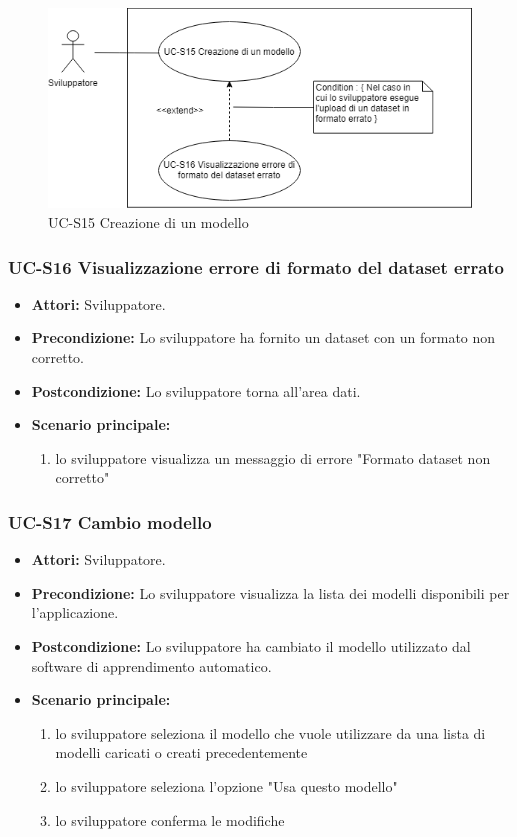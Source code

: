 		\begin{figure}[h]
			\centering
			\includegraphics[scale=0.7]{images/UC-S15.png}
				\caption{UC-S15 Creazione di un modello}
		\end{figure}	
	
	\subsubsection{UC-S16 Visualizzazione errore di formato del dataset errato}	
	\begin{itemize}					
			\item \textbf{Attori:} Sviluppatore.
			\item \textbf{Precondizione:} Lo sviluppatore ha fornito un dataset con un formato non corretto.
			\item \textbf{Postcondizione:} Lo sviluppatore torna all'area dati.
			\item \textbf{Scenario principale:}
				\begin{enumerate}
					\item lo sviluppatore visualizza un messaggio di errore "Formato dataset non corretto"
				\end{enumerate}	
		\end{itemize}		
	
	\subsubsection{UC-S17 Cambio modello}
	\begin{itemize}					
			\item \textbf{Attori:} Sviluppatore.
			\item \textbf{Precondizione:} Lo sviluppatore visualizza la lista dei modelli disponibili per l'applicazione.
			\item \textbf{Postcondizione:} Lo sviluppatore ha cambiato il modello utilizzato dal software di apprendimento automatico.
			\item \textbf{Scenario principale:}
				\begin{enumerate}
					\item lo sviluppatore seleziona il modello che vuole utilizzare da una lista di modelli caricati o creati precedentemente
					\item lo sviluppatore seleziona l'opzione "Usa questo modello"
					\item lo sviluppatore conferma le modifiche
				\end{enumerate}	
		\end{itemize}		
	